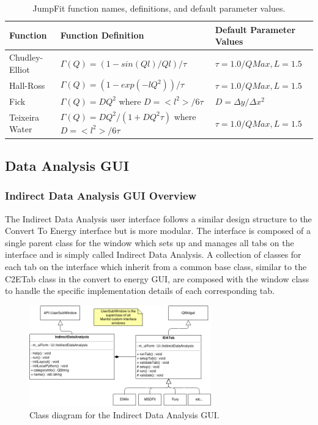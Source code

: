 \documentclass[paper=a4, fontsize=11pt]{scrartcl}	%
\numberwithin{equation}{section}															%
\numberwithin{figure}{section}																%
\numberwithin{table}{section}																%
\begin{document}
\begin{table}[H]
\begin{center}
\begin{tabular}{ l l l}
Function & Function Definition & Default Parameter Values \\ \hline
Chudley-Elliot &  $\Gamma(Q) = (1 - sin(Ql)/Ql)/\tau$ & $\tau = 1.0/QMax, L=1.5$\\ \hline
Hall-Ross & $\Gamma(Q) = (1-exp(-lQ^2))/\tau$ & $\tau = 1.0/QMax, L=1.5$ \\ \hline
Fick & \parbox{6cm}{$\Gamma(Q) = DQ^2$ \\ where $D=<l^2>/6\tau$} & $D = \Delta y / \Delta x^2$\\ \hline
Teixeira Water & \parbox{6cm}{$\Gamma(Q) = DQ^2/(1 + DQ^2\tau)$ \\ where $D=<l^2>/6\tau$} & $\tau = 1.0/QMax, L=1.5$ \\ \hline
\end{tabular}
\caption{JumpFit function names, definitions, and default parameter values.}
\label{table:jumpfit-functions}
\end{center}
\end{table}

\subsection{Data Analysis GUI}

\subsubsection{Indirect Data Analysis GUI Overview}
\label{subsubsec:IDA-GUI-Overview}
The Indirect Data Analysis user interface follows a similar design structure to the Convert To Energy interface but is more modular. The interface is composed of a single parent class for the window which sets up and manages all tabs on the interface and is simply called Indirect Data Analysis. A collection of classes for each tab on the interface which inherit from a common base class, similar to the C2ETab class in the convert to energy GUI, are composed with the window class to handle the specific implementation details of each corresponding tab.

\begin{figure}[H]
\centering
\includegraphics[width=0.7\textwidth]{img/uml/class_diagrams/IDA_structure.png}
\caption{Class diagram for the Indirect Data Analysis GUI.}
\label{fig:IDA-class-diagram}
\end{figure}
\end{document}
